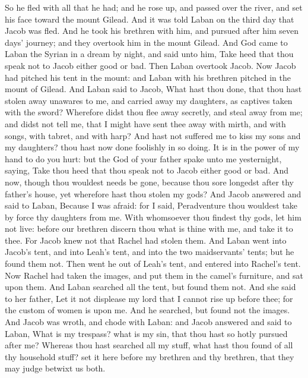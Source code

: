 \begin{biblechapter}
\verse So he fled with all that he had; and he rose up, and passed over the river, and set his face toward the mount Gilead.
 And it was told Laban on the third day that Jacob was fled.
\verse And he took his brethren with him, and pursued after him seven days' journey; and they overtook him in the mount Gilead.
\verse And God came to Laban the Syrian in a dream by night, and said unto him, Take heed that thou speak not to Jacob either good or bad.
\verse Then Laban overtook Jacob. Now Jacob had pitched his tent in the mount: and Laban with his brethren pitched in the mount of Gilead.
\verse And Laban said to Jacob, What hast thou done, that thou hast stolen away unawares to me, and carried away my daughters, as captives taken with the sword?
\verse Wherefore didst thou flee away secretly, and steal away from me; and didst not tell me, that I might have sent thee away with mirth, and with songs, with tabret, and with harp?
\verse And hast not suffered me to kiss my sons and my daughters? thou hast now done foolishly in so doing.
\verse It is in the power of my hand to do you hurt: but the God of your father spake unto me yesternight, saying, Take thou heed that thou speak not to Jacob either good or bad.
\verse And now, though thou wouldest needs be gone, because thou sore longedst after thy father's house, yet wherefore hast thou stolen my gods?
\verse And Jacob answered and said to Laban, Because I was afraid: for I said, Peradventure thou wouldest take by force thy daughters from me.
\verse With whomsoever thou findest thy gods, let him not live: before our brethren discern thou what is thine with me, and take it to thee. For Jacob knew not that Rachel had stolen them.
\verse And Laban went into Jacob's tent, and into Leah's tent, and into the two maidservants' tents; but he found them not. Then went he out of Leah's tent, and entered into Rachel's tent.
\verse Now Rachel had taken the images, and put them in the camel's furniture, and sat upon them. And Laban searched all the tent, but found them not.
\verse And she said to her father, Let it not displease my lord that I cannot rise up before thee; for the custom of women is upon me. And he searched, but found not the images.
\verse And Jacob was wroth, and chode with Laban: and Jacob answered and said to Laban, What is my trespass? what is my sin, that thou hast so hotly pursued after me?
\verse Whereas thou hast searched all my stuff, what hast thou found of all thy household stuff? set it here before my brethren and thy brethren, that they may judge betwixt us both.

\end{biblechapter}
